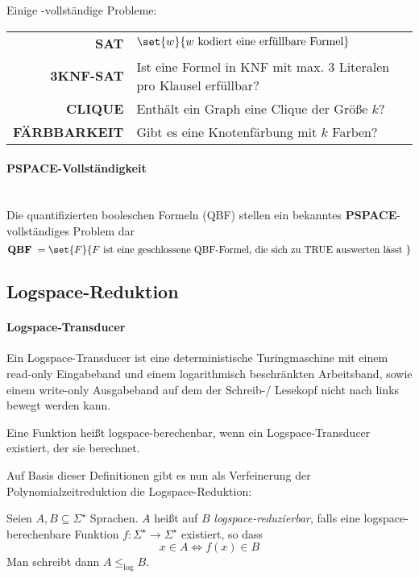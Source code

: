 Einige \npoly-vollständige Probleme:
\begin{center}
	\begin{tabular}{r|l}
		\textbf{SAT} & $\set{w}{w\text{ kodiert eine erfüllbare Formel}}$\\
		\textbf{3KNF-SAT} & Ist eine Formel in KNF mit max. 3 Literalen pro Klausel erfüllbar?\\
		\textbf{CLIQUE} & Enthält ein Graph eine Clique der Größe $k$?\\
		\textbf{FÄRBBARKEIT} & Gibt es eine Knotenfärbung mit $k$ Farben?\\
	\end{tabular}
\end{center}

\paragraph{PSPACE-Vollständigkeit}\ \\
Die quantifizierten booleschen Formeln (QBF) stellen ein bekanntes \textbf{PSPACE}-vollständiges Problem dar
$$\text{\textbf{QBF} }=\set{F}{F\text{ ist eine geschlossene QBF-Formel, die sich zu TRUE auswerten lässt }}$$

\subsection{Logspace-Reduktion}\label{subsec:logspace}
\paragraph{Logspace-Transducer}
Ein Logspace-Transducer ist eine deterministische Turingmaschine mit einem read-only Eingabeband und einem logarithmisch beschränkten Arbeitsband, sowie einem write-only Ausgabeband auf dem der Schreib-/ Lesekopf nicht nach links bewegt werden kann.

Eine Funktion heißt logspace-berechenbar, wenn ein Logspace-Transducer existiert, der sie berechnet.

\par

Auf Basis dieser Definitionen gibt es nun als Verfeinerung der Polynomialzeitreduktion die Logspace-Reduktion:

Seien $A,B\subseteq \Sigma^\star$ Sprachen. $A$ heißt auf $B$ \emph{logspace-reduzierbar}, falls eine logspace-berechenbare Funktion $f:\Sigma^\star\rightarrow\Sigma^\star$ existiert, so dass
\begin{equation*}
	x\in A\Leftrightarrow f(x)\in B
\end{equation*}
Man schreibt dann $A\leq_{\log} B$.

